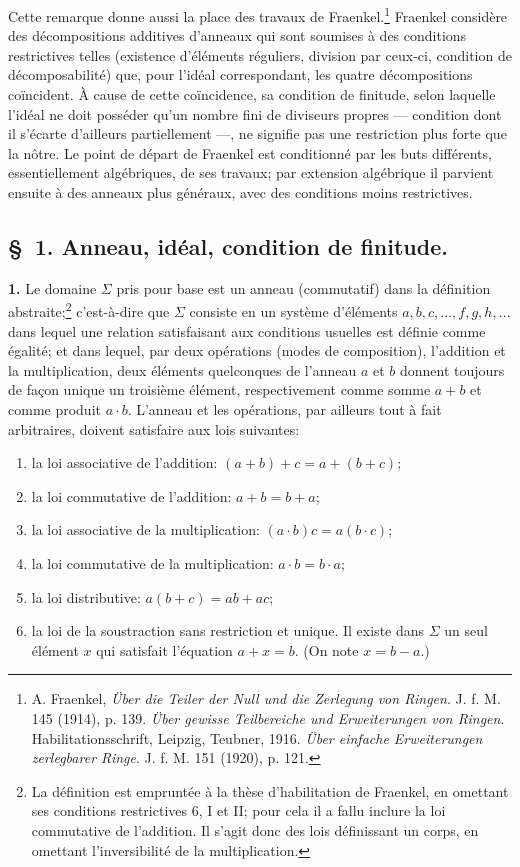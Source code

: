 Cette remarque donne aussi la place des travaux de Fraenkel.\footnote{A. Fraenkel, \emph{Über die Teiler der Null und die Zerlegung von Ringen}. J. f. M. 145 (1914), p. 139. \emph{Über gewisse Teilbereiche und Erweiterungen von Ringen}. Habilitationsschrift, Leipzig, Teubner, 1916. \emph{Über einfache Erweiterungen zerlegbarer Ringe}. J. f. M. 151 (1920), p. 121.} Fraenkel considère des décompositions additives d'anneaux qui sont soumises à des conditions restrictives telles (existence d'éléments réguliers, division par ceux-ci, condition de décomposabilité) que, pour l'idéal correspondant, les quatre décompositions coïncident. À cause de cette coïncidence, sa condition de finitude, selon laquelle l'idéal ne doit posséder qu'un nombre fini de diviseurs propres --- condition dont il s'écarte d'ailleurs partiellement ---, ne signifie pas une restriction plus forte que la nôtre. Le point de départ de Fraenkel est conditionné par les buts différents, essentiellement algébriques, de ses travaux; par extension algébrique il parvient ensuite à des anneaux plus généraux, avec des conditions moins restrictives.

\subsection*{\S~1. Anneau, idéal, condition de finitude.}

\textbf{1.} Le domaine $\Sigma$ pris pour base est un anneau (commutatif) dans la définition abstraite;\footnote{La définition est empruntée à la thèse d'habilitation de Fraenkel, en omettant ses conditions restrictives 6, I et II; pour cela il a fallu inclure la loi commutative de l'addition. Il s'agit donc des lois définissant un corps, en omettant l'inversibilité de la multiplication.} c'est-à-dire que $\Sigma$ consiste en un système d'éléments $a,b,c,\ldots,f,g,h,\ldots$ dans lequel une relation satisfaisant aux conditions usuelles est définie comme égalité; et dans lequel, par deux opérations (modes de composition), l'addition et la multiplication, deux éléments quelconques de l'anneau $a$ et $b$ donnent toujours de façon unique un troisième élément, respectivement comme somme $a+b$ et comme produit $a\cdot b$. L'anneau et les opérations, par ailleurs tout à fait arbitraires, doivent satisfaire aux lois suivantes:
\begin{enumerate}
\item la loi associative de l'addition: $(a+b)+c=a+(b+c)$;
\item la loi commutative de l'addition: $a+b=b+a$;
\item la loi associative de la multiplication: $(a\cdot b)c=a(b\cdot c)$;
\item la loi commutative de la multiplication: $a\cdot b=b\cdot a$;
\item la loi distributive: $a(b+c)=ab+ac$;
\item la loi de la soustraction sans restriction et unique. Il existe dans $\Sigma$ un seul élément $x$ qui satisfait l'équation $a+x=b$. (On note $x=b-a$.)
\end{enumerate}

